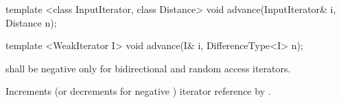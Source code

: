 %
\begin{removedblock}
\begin{itemdecl}
template <class InputIterator, class Distance>
  void advance(InputIterator& i, Distance n);
\end{itemdecl}
\end{removedblock}
\begin{addedblock}
\begin{itemdecl}
template <WeakIterator I>
  void advance(I& i, DifferenceType<I> n);
\end{itemdecl}
\end{addedblock}

\begin{itemdescr}
\pnum
\requires
{}
shall be negative only for bidirectional and random access iterators.

\pnum
\effects
Increments (or decrements for negative
)
iterator reference
by
.
\end{itemdescr}


